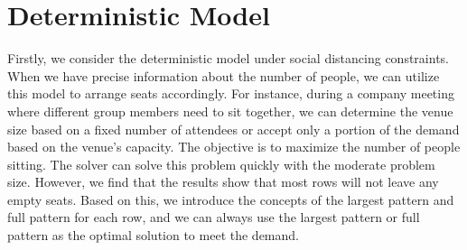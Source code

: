 \section{Deterministic Model}

Firstly, we consider the deterministic model under social distancing constraints. When we have precise information about the number of people, we can utilize this model to arrange seats accordingly. For instance, during a company meeting where different group members need to sit together, we can determine the venue size based on a fixed number of attendees or accept only a portion of the demand based on the venue's capacity. The objective is to maximize the number of people sitting. The solver can solve this problem quickly with the moderate problem size. However, we find that the results show that most rows will not leave any empty seats. Based on this, we introduce the concepts of the largest pattern and full pattern for each row, and we can always use the largest pattern or full pattern as the optimal solution to meet the demand.

